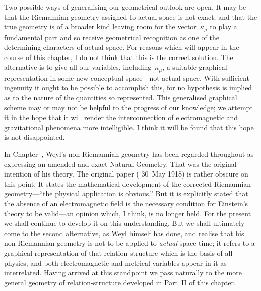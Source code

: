 \documentclass[12pt]{book}
\begin{document}
Two possible ways of generalising our geometrical outlook are open. It
may be that the Riemannian geometry assigned to actual space is not exact;
and that the true geometry is of a broader kind leaving room for the vector~$\kappa_{\mu}$
to play a fundamental part and so receive geometrical recognition as one
of the determining characters of actual space. For reasons which will appear
in the course of this chapter, I do not think that this is the correct solution.
The alternative is to give all our variables, including~$\kappa_{\mu}$, a suitable graphical
representation in some new conceptual space---not actual space. With sufficient
ingenuity it ought to be possible to accomplish this, for no hypothesis is implied
as to the nature of the quantities so represented. This generalised graphical
scheme may or may not be helpful to the progress of our knowledge; we
attempt it in the hope that it will render the interconnection of electromagnetic
and gravitational phenomena more intelligible. I think it will be found
that this hope is not disappointed.

In  Chapter~, Weyl's non\hyp{}Riemannian
geometry has been regarded throughout as expressing an amended and
exact Natural Geometry. That was the original intention of his theory\footnotemark.\footnotetext
  {The original paper ( 30~May 1918) is rather obscure on this point.
  It states the mathematical development of the corrected Riemannian geometry---``the physical
  application is obvious.'' But it is explicitly stated that the absence of an electromagnetic field is
  the necessary condition for Einstein's theory to be valid---an opinion which, I think, is no longer
  held.}
For the present we shall continue to develop it on this understanding. But
we shall ultimately come to the second alternative, as Weyl himself has done,
and realise that his non\hyp{}Riemannian geometry is not to be applied to \emph{actual}
%
space-time; it refers to a graphical representation of that relation\hyp{}structure
which is the basis of all physics, and both electromagnetic and metrical
variables appear in it as interrelated. Having arrived at this standpoint we
pass naturally to the more general geometry of relation\hyp{}structure developed
in Part~II of this chapter.%
\end{document}
